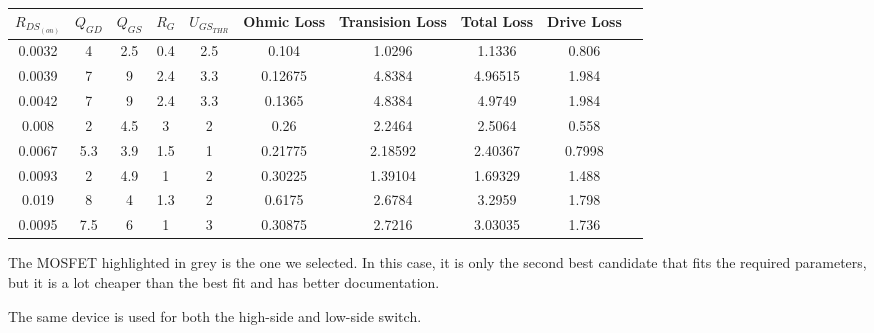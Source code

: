 \begin{table}[th!]
    \begin{center}
        \caption{}
        \label{tab:circuit:buck:mosfet}
        \begin{tabular}{cccccccccc}
            \toprule
            $R_{DS_{(on)}}$ & $Q_{GD}$ & $Q_{GS}$ & $R_G$ & $U_{GS_{THR}}$ & Ohmic Loss & Transision Loss & Total Loss & Drive Loss \\
            \midrule
            0.0032          & 4        & 2.5      & 0.4   & 2.5            & 0.104      & 1.0296          & 1.1336     & 0.806 \\
            0.0039          & 7        & 9        & 2.4   & 3.3            & 0.12675    & 4.8384          & 4.96515    & 1.984 \\
            0.0042          & 7        & 9        & 2.4   & 3.3            & 0.1365     & 4.8384          & 4.9749     & 1.984 \\
            0.008           & 2        & 4.5      & 3     & 2              & 0.26       & 2.2464          & 2.5064     & 0.558 \\
            0.0067          & 5.3      & 3.9      & 1.5   & 1              & 0.21775    & 2.18592         & 2.40367    & 0.7998 \\
            \rowcolor{lightgray}
            0.0093          & 2        & 4.9      & 1     & 2              & 0.30225    & 1.39104         & 1.69329    & 1.488 \\
            0.019           & 8        & 4        & 1.3   & 2              & 0.6175     & 2.6784          & 3.2959     & 1.798 \\
            0.0095          & 7.5      & 6        & 1     & 3              & 0.30875    & 2.7216          & 3.03035    & 1.736 \\
            \bottomrule
        \end{tabular}
    \end{center}
\end{table}

The MOSFET highlighted in grey is the one we selected. In  this case, it is only
the second best candidate that fits the required parameters, but  it  is  a  lot
cheaper than the best fit and has better documentation.

The same device is used for both the high-side and low-side switch.

